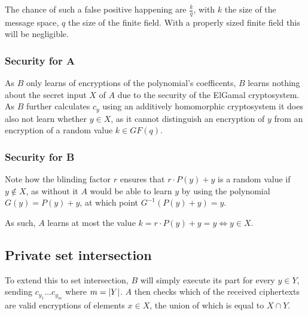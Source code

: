 \documentclass[a4paper]{scrreprt}
\DeclarePairedDelimiter\abs{\lvert}{\rvert}
\begin{document}
The chance of such a false positive happening are $\frac{k}{q}$, with $k$ the
size of the message space, $q$ the size of the finite field. With a properly
sized finite field this will be negligible.

\subsubsection{Security for A}

As $B$ only learns of encryptions of the polynomial's coefficents, $B$ learns
nothing about the secret input $X$ of $A$ due to the security of the ElGamal
cryptosystem. As $B$ further calculates $c_y$ using an additively homomorphic
cryptosystem it does also not learn whether $y \in X$, as it cannot distinguish
an encryption of $y$ from an encryption of a random value $k \in GF(q)$.

\subsubsection{Security for B}

Note how the blinding factor $r$ ensures that $r \cdot P(y) + y$ is a random
value if $y \not \in X$, as without it $A$ would be able to learn $y$ by using
the polynomial $G(y) = P(y) + y$, at which point $G^{-1}(P(y) + y) = y$.

As such, $A$ learns at most the value $k = r \cdot P(y) + y = y \Leftrightarrow
y \in X$.

\subsection{Private set intersection}

To extend this to set intersection, $B$ will simply execute its part for every
$y \in Y$, sending $c_{y_1} \ldots c_{y_m}$ where $m = \abs{Y}$. $A$ then
checks which of the received ciphertexts are valid encryptions of elements $x
\in X$, the union of which is equal to $X \cap Y$.
\end{document}
